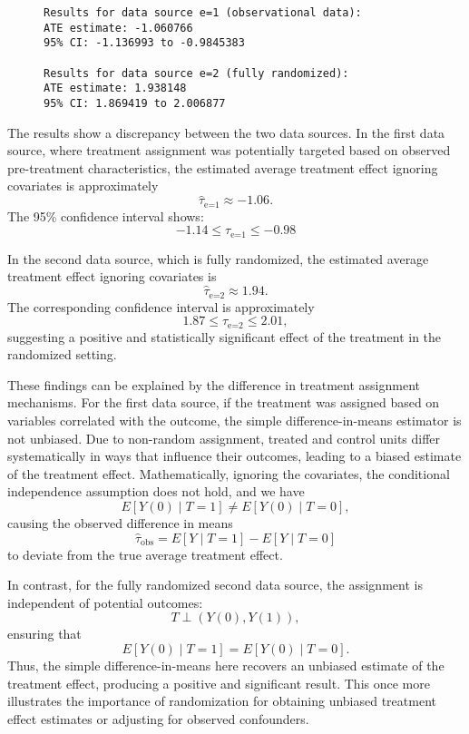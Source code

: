 \documentclass{article}
\begin{document}
\begin{figure}[H]
  \begin{lstlisting}[style=RstyleComment, caption=ATE and Confidence Interval Estimates Ignoring Covariates]
Results for data source e=1 (observational data):
ATE estimate: -1.060766 
95% CI: -1.136993 to -0.9845383 

Results for data source e=2 (fully randomized):
ATE estimate: 1.938148 
95% CI: 1.869419 to 2.006877 
  \end{lstlisting}
\end{figure}

The results show a discrepancy between the two data sources. In the first data source, where treatment assignment was potentially targeted based on observed pre-treatment characteristics, the estimated average treatment effect ignoring covariates is approximately 
\[
\widehat{\tau}_{\text{e=1}} \approx -1.06.
\]
The 95\% confidence interval shows:
\[
-1.14 \leq \tau_{\text{e=1}} \leq -0.98
\]

In the second data source, which is fully randomized, the estimated average treatment effect ignoring covariates is 
\[
\widehat{\tau}_{\text{e=2}} \approx 1.94.
\]
The corresponding confidence interval is approximately 
\[
1.87 \leq \tau_{\text{e=2}} \leq 2.01,
\]
suggesting a positive and statistically significant effect of the treatment in the randomized setting.

These findings can be explained by the difference in treatment assignment mechanisms. For the first data source, if the treatment was assigned based on variables correlated with the outcome, the simple difference-in-means estimator is not unbiased. Due to non-random assignment, treated and control units differ systematically in ways that influence their outcomes, leading to a biased estimate of the treatment effect. Mathematically, ignoring the covariates, the conditional independence assumption does not hold, and we have
\[
E[Y(0)\mid T=1] \neq E[Y(0)\mid T=0],
\]
causing the observed difference in means 
\[
\widehat{\tau}_{\text{obs}} = E[Y\mid T=1] - E[Y\mid T=0]
\]
to deviate from the true average treatment effect.

In contrast, for the fully randomized second data source, the assignment is independent of potential outcomes:
\[
T \perp (Y(0), Y(1)),
\]
ensuring that
\[
E[Y(0)\mid T=1] = E[Y(0)\mid T=0].
\]
Thus, the simple difference-in-means here recovers an unbiased estimate of the treatment effect, producing a positive and significant result. This once more illustrates the importance of randomization for obtaining unbiased treatment effect estimates or adjusting for observed confounders.
\end{document}
